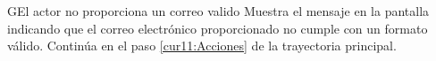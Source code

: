  \begin{UCtrayectoriaA}{G}{El actor no proporciona un correo valido}
    \UCpaso[\UCsist] Muestra el mensaje  en la pantalla  indicando que el correo electrónico proporcionado no cumple con un formato válido.
	    \UCpaso Continúa en el paso \ref{cur11:Acciones} de la trayectoria principal.
 \end{UCtrayectoriaA}
 
